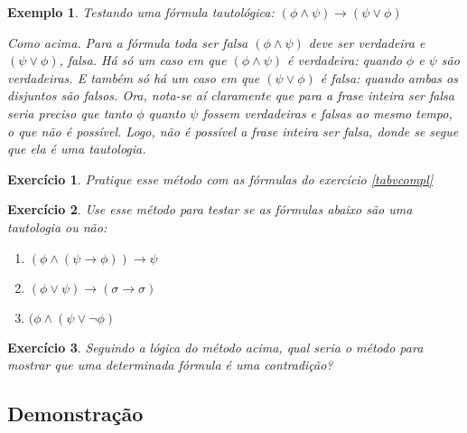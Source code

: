 \documentclass[a4paper,10pt]{article}
\newtheorem{exrcc}{Exercício}[subsection] %
\newtheorem{exmpl}{Exemplo}[subsection] %
\begin{document}
\begin{exmpl}
\label{testtauto}
Testando uma fórmula tautológica: $(\phi\wedge\psi)\rightarrow(\psi\vee\phi)$

Como acima. Para a fórmula toda ser falsa $(\phi\wedge\psi)$
deve ser verdadeira e $(\psi\vee\phi)$, falsa. Há só um caso em que
$(\phi\wedge\psi)$ é verdadeira: quando $\phi$ e $\psi$ são verdadeiras. E também só há
um caso em que $(\psi\vee\phi)$
é falsa: quando ambas os disjuntos são falsos. Ora, nota-se aí claramente que para a
frase inteira ser falsa seria preciso que tanto $\phi$ quanto $\psi$ fossem verdadeiras
e falsas ao mesmo tempo, o que não é possível. Logo, não é possível a frase inteira ser
falsa, donde se segue que ela é uma tautologia. 

 
\end{exmpl}

\begin{exrcc}
Pratique esse método com as fórmulas do exercício \ref{tabvcompl}
\end{exrcc}

\begin{exrcc}
 Use esse método para testar se as fórmulas abaixo são uma tautologia ou não:

\begin{enumerate}
\renewcommand{\theenumi}{\roman{enumi}}
 \item $(\phi\wedge(\psi\rightarrow\phi))\rightarrow\psi$
 \item $(\phi\vee\psi)\rightarrow(\sigma\rightarrow\sigma)$
 \item $(\phi\wedge(\psi\vee\neg\phi)$
\end{enumerate}

 
\end{exrcc}

\begin{exrcc}
 Seguindo a lógica do método acima, qual seria o método para mostrar que uma
determinada fórmula é uma contradição?
\end{exrcc}


\subsection{Demonstração}
\end{document}

